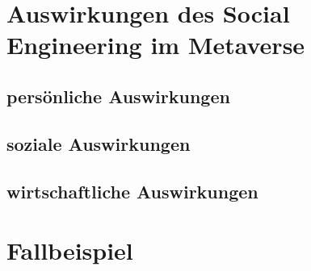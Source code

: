 \section{Auswirkungen des Social Engineering im Metaverse}

\subsection{persönliche Auswirkungen}
\subsection{soziale Auswirkungen}
\subsection{wirtschaftliche Auswirkungen}

\section{Fallbeispiel}

